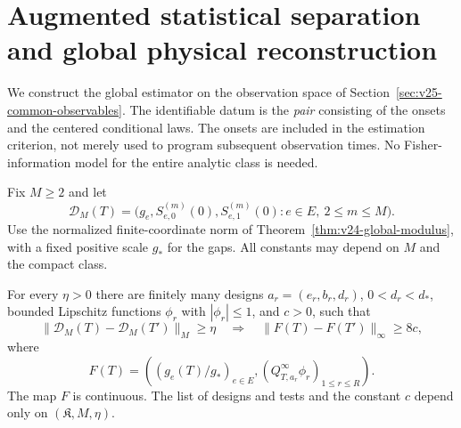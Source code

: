 \section{Augmented statistical separation and global physical reconstruction}
\label{sec:v25-uniform-physical-global}
\label{sec:v24-uniform-physical-global}

We construct the global estimator on the observation space of
Section~\ref{sec:v25-common-observables}.  The identifiable datum is the
\emph{pair} consisting of the onsets and the centered conditional laws.
The onsets are included in the estimation criterion, not merely used to
program subsequent observation times.  No Fisher-information model for the
entire analytic class is needed.

Fix \(M\ge2\) and let
\[
 \mathcal D_M(T)=\bigl(g_e,S_{e,0}^{(m)}(0),S_{e,1}^{(m)}(0):
                        e\in E,\ 2\le m\le M\bigr).
\]
Use the normalized finite-coordinate norm of
Theorem~\ref{thm:v24-global-modulus}, with a fixed positive scale \(g_*\)
for the gaps.  All constants may depend on \(M\) and the compact class.

\begin{lemma}
\label{lem:v25-augmented-separators}
\label{lem:v24-finite-separators}
For every \(\eta>0\) there are finitely many designs
\(a_r=(e_r,b_r,d_r)\), \(0<d_r<d_*\), bounded Lipschitz functions
\(\phi_r\) with \(|\phi_r|\le1\), and \(c>0\), such that
\begin{equation}\label{eq:v25-mixed-separation}
 \|\mathcal D_M(T)-\mathcal D_M(T')\|_M\ge\eta
 \quad\Longrightarrow\quad
 \|F(T)-F(T')\|_\infty\ge8c,
\end{equation}
where
\begin{equation}\label{eq:v25-augmented-moment-map}
 F(T)=\left((g_e(T)/g_*)_{e\in E},
       (Q_{T,a_r}^{\infty}\phi_r)_{1\le r\le R}\right).
\end{equation}
The map \(F\) is continuous.  The list of designs and tests and the
constant \(c\) depend only on \((\mathfrak K,M,\eta)\).
\end{lemma}

